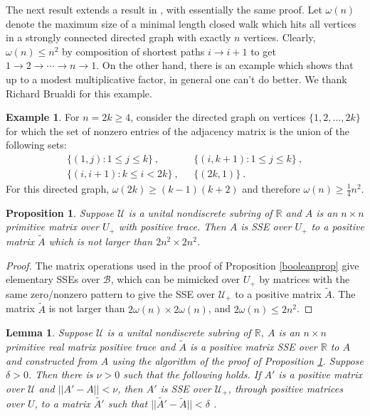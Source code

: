 \documentclass{amsart}
\newtheorem{lemma}[theorem]{Lemma}
\newtheorem{proposition}[theorem]{Proposition}
\theoremstyle{definition}
\newtheorem{example}[theorem]{Example}
\theoremstyle{remark}
\numberwithin{equation}{section}
\begin{document}
{{The next result extends a result in \cite{KR3}, with essentially
the same proof. Let $\omega(n)$ denote the maximum size of a minimal 
length closed walk which hits all vertices 
in a strongly connected directed graph with exactly $n$ vertices. 
Clearly, $\omega (n)\leq n^2$ by composition of shortest paths 
$i\to i+1$ to get $1\to 2 \to\cdots \to n \to 1$.
On the other hand, there is an example which shows that up to a 
modest multiplicative factor, in general one can't do better. 
We thank Richard Brualdi for this example. 

\begin{example}\label{brualdiexample}  For $n=2k\geq 4$, 
 consider  
the directed graph on vertices $\{1,2, \dots , 2k\}$ 
for which the set of nonzero entries of the adjacency matrix 
is the union of the following  sets:  
\begin{align*}
\{ (1,j):1\leq j \leq k\} \ , \ \ \ 
& \{ (i,k+1):1\leq j \leq k\} \ ,  \\ 
\{ (i,i+1):k\leq i <2k\}\ , \ \ \ 
&\{ (2k,1)\} \ .
\end{align*}  
For this directed graph, 
$\omega (2k)\geq (k-1)(k+2)$ and therefore 
$\omega (n)\geq \frac 14 n^2$. 
 \end{example} 

\begin{proposition} \label{primtopos} 
Suppose $\mathcal U$ is a unital nondiscrete subring 
of $\mathbb R$ and $A$ is an $n\times n$  primitive 
matrix over $U_+$ with positive trace. 
Then $A$ is SSE over $U_+$
to a positive matrix $\widetilde A$ 
which is not larger than $2n^2\times 2n^2$. 
\end{proposition} 

\begin{proof} 

The 
 matrix operations used in the proof 
of Proposition \ref{booleanprop} give   elementary SSEs 
over $\mathcal B$, 
which can be mimicked over $U_+$ by matrices with the same 
zero/nonzero pattern  
to give the SSE over $\mathcal U_+$ to a positive matrix 
$\widetilde A$.  
The matrix $\widetilde A$ is not larger than 
$2\omega(n)\times 2\omega(n)$, and 
$2\omega(n)\leq 2n^2 $. 
\end{proof} 

\begin{lemma}\label{pospos} 
Suppose $\mathcal U$ is a unital nondiscrete subring 
of $\mathbb R$, $A$ is an $n\times n$  primitive 
real matrix positive trace and 
$\widetilde A$ is a positive matrix 
SSE over  $\mathbb R$ to $A$ and 
constructed from $A$ using the algorithm of the proof 
of Proposition \ref{primtopos}. 
Suppose $\delta >0$. 
Then there is $\nu >0$ such that the following holds. 
If $A'$ is a positive matrix over $\mathcal U$ and $||A'-A||< \nu$, 
then $A'$ is SSE over $\mathcal U_+$, through positive matrices over 
 $U$, to a matrix $\widetilde{A'}$
such that  $||\widetilde{A'}-\widetilde{A}||< \delta$ .
\end{lemma} 

}}
\end{document}
